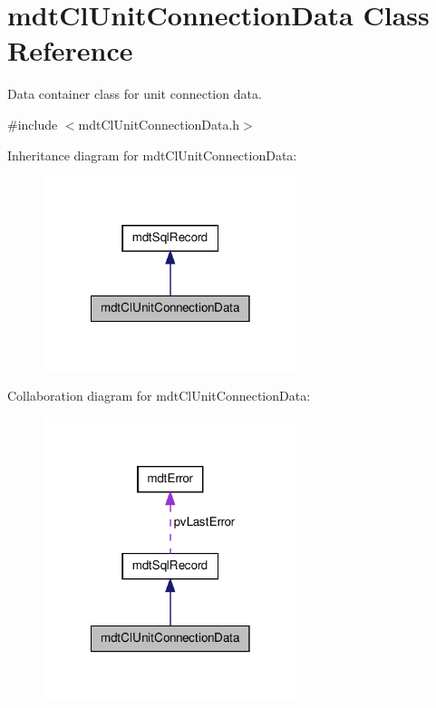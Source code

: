 \hypertarget{classmdt_cl_unit_connection_data}{\section{mdt\-Cl\-Unit\-Connection\-Data Class Reference}
\label{classmdt_cl_unit_connection_data}
}


Data container class for unit connection data.  




{\ttfamily \#include $<$mdt\-Cl\-Unit\-Connection\-Data.\-h$>$}



Inheritance diagram for mdt\-Cl\-Unit\-Connection\-Data\-:\nopagebreak
\begin{figure}[H]
\begin{center}
\leavevmode
\includegraphics[width=210pt]{classmdt_cl_unit_connection_data__inherit__graph}
\end{center}
\end{figure}


Collaboration diagram for mdt\-Cl\-Unit\-Connection\-Data\-:\nopagebreak
\begin{figure}[H]
\begin{center}
\leavevmode
\includegraphics[width=210pt]{classmdt_cl_unit_connection_data__coll__graph}
\end{center}
\end{figure}
